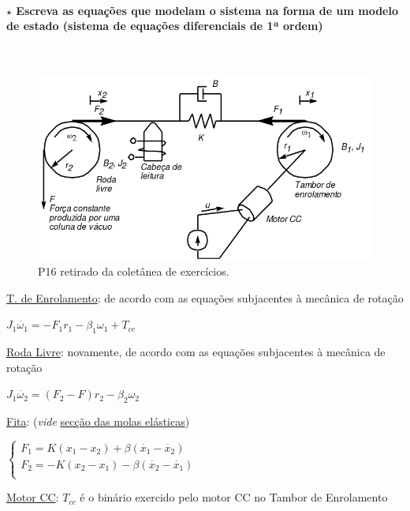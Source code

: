 \paragraph[3.2.2.1 Problema 1]{$\pmb{\star}$ Escreva as equações que modelam o sistema na forma de um modelo de estado (sistema
de equações diferenciais de 1ª ordem)}\mbox{}\\
\begin{figure}[H]
    \centering
    \includegraphics[width = 0.6\linewidth]{img/mechanics/motor-cc-P16.png}
    \caption{P16 retirado da coletânea de exercícios.}
    \label{fig:motor-cc-P16}
\end{figure}

\noindent\underline{T. de Enrolamento}: de acordo com as equações subjacentes à mecânica de rotação

\noindent \hspace*{1.5 em}\raisebox{0.2 em}{$\drsh$} $J_1 \dot{\omega_1} = - F_1 r_1 - \beta_1 \omega_1 + T_{cc}$

\vspace{0.5em}
\noindent\underline{Roda Livre}: novamente, de acordo com as equações subjacentes à mecânica de rotação 

\noindent \hspace*{1.5 em}\raisebox{0.2 em}{$\drsh$} $J_1 \dot{\omega_2} = (F_2 - F) r_2 - \beta_2 \omega_2$

\vspace{0.5em}
\noindent\underline{Fita}: (\textit{vide} \hyperref[def:MolasElásticas]{secção das molas elásticas})

\noindent \hspace*{1.5 em}\raisebox{0.2 em}{$\drsh$} $
                \begin{cases}
                    F_1 = K(x_1 - x_2) + \beta(\dot{x_1} - \dot{x_2})\\
                    F_2 = -K(x_2 - x_1) - \beta(\dot{x_2} - \dot{x_1})\\
                \end{cases}
$

\vspace{0.5em}
\noindent\underline{Motor CC}: $T_{cc}$ é o binário exercido pelo motor CC no Tambor de Enrolamento

